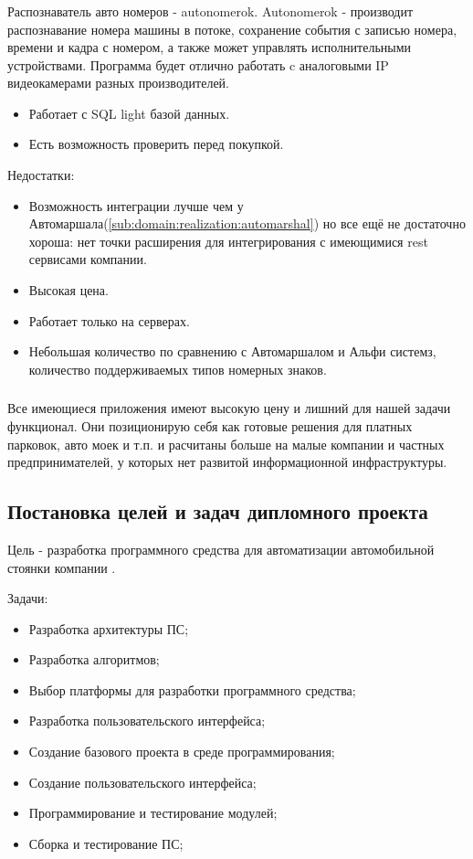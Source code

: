 \subsubsection{}
Распознаватель авто номеров - autonomerok. Autonomerok - производит распознавание номера машины в потоке, сохранение события с записью номера, времени и кадра с номером, а также может управлять исполнительными устройствами. Программа будет отлично работать c аналоговыми IP видеокамерами разных производителей.
\begin{itemize}
  \item Работает с SQL light базой данных.
  \item Есть возможность проверить перед покупкой.
\end{itemize}
Недостатки:
\begin{itemize}
  \item Возможность интеграции лучше чем у Автомаршала(\ref{sub:domain:realization:automarshal}) но все ещё не достаточно хороша: нет точки расширения для интегрирования с имеющимися rest сервисами компании.
  \item Высокая цена.
  \item Работает только на \windows{} серверах.
  \item Небольшая количество по сравнению с Автомаршалом и Альфи системз, количество поддерживаемых типов номерных знаков.
\end{itemize}

\subsubsection{} Все имеющиеся приложения имеют высокую цену и лишний для нашей задачи функционал. Они позиционирую себя как готовые решения для платных парковок, авто моек и т.п. и расчитаны больше на малые компании и частных предпринимателей, у которых нет развитой информационной инфраструктуры. 

\subsection{Постановка целей и задач дипломного проекта}
Цель - разработка программного средства для автоматизации автомобильной стоянки компании \company{}.


Задачи:
\begin{itemize}
  \item Разработка архитектуры ПС;
  \item Разработка алгоритмов;
  \item Выбор платформы для разработки программного средства;
  \item Разработка пользовательского интерфейса;
  \item Создание базового проекта в среде программирования;
  \item Создание пользовательского интерфейса;
  \item Программирование и тестирование модулей;
  \item Сборка и тестирование ПС;
\end{itemize}
